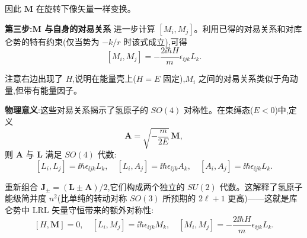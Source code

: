 \begin{solution}
	因此 $\mathbf M$ 在旋转下像矢量一样变换。

	\textbf{第三步:$\mathbf M$ 与自身的对易关系} 进一步计算 $[M_i,M_j]$。利用已得的对易关系和对库仑势的特有约束(仅当势为 $-k/r$ 时该式成立),可得
	\[
	[M_i,M_j] = -\frac{2\ii\hbar H}{m}\epsilon_{\ii jk}L_k.
	\]

	注意右边出现了 $H$,说明在能量壳上($H=E$ 固定),$M_i$ 之间的对易关系类似于角动量,但带有能量因子。

	\textbf{物理意义}:这些对易关系揭示了氢原子的 $SO(4)$ 对称性。在束缚态($E<0$)中,定义
	\[
	\mathbf A = \sqrt{-\frac{m}{2E}}\,\mathbf M,
	\]
	则 $\mathbf A$ 与 $\mathbf L$ 满足 $SO(4)$ 代数:
	\[
	[L_i,L_j]=\ii\hbar\epsilon_{\ii jk}L_k,\quad
	[L_i,A_j]=\ii\hbar\epsilon_{\ii jk}A_k,\quad
	[A_i,A_j]=\ii\hbar\epsilon_{\ii jk}L_k.
	\]

	重新组合 $\mathbf J_\pm = (\mathbf L\pm\mathbf A)/2$,它们构成两个独立的 $SU(2)$ 代数。这解释了氢原子能级简并度 $n^2$(比单纯的转动对称 $SO(3)$ 所预期的 $2\ell+1$ 更高)——这就是库仑势中 LRL 矢量守恒带来的额外对称性:
	\[
	\boxed{[H,\mathbf M]=0,\quad [L_i,M_j]=\ii\hbar\epsilon_{\ii jk}M_k,\quad
	[M_i,M_j]=-\frac{2\ii\hbar H}{m}\epsilon_{\ii jk}L_k}.
	\]
	\end{solution}

